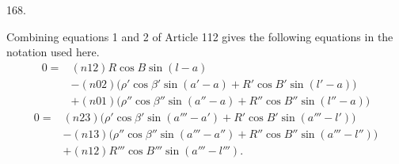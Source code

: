 \par{}\medskip
\begin{center}\hypertarget{native-231-article168}{}168.\end{center}
Combining equations 1 and 2 of Article 112 gives the following equations in the notation used here.
\[
\begin{aligned}
0={}&(n12)R\cos B\sin(l-a)\\
&-(n02)\bigl(\rho'\cos\beta'\sin(a'-a)+R'\cos B'\sin(l'-a)\bigr)\\
&+(n01)\bigl(\rho''\cos\beta''\sin(a''-a)+R''\cos B''\sin(l''-a)\bigr)
\end{aligned}
\]
\[
\begin{aligned}
0={}&(n23)\bigl(\rho'\cos\beta'\sin(a'''-a')+R'\cos B'\sin(a'''-l')\bigr)\\
&-(n13)\bigl(\rho''\cos\beta''\sin(a'''-a'')+R''\cos B''\sin(a'''-l'')\bigr)\\
&+(n12)R'''\cos B'''\sin(a'''-l''').
\end{aligned}
\]

